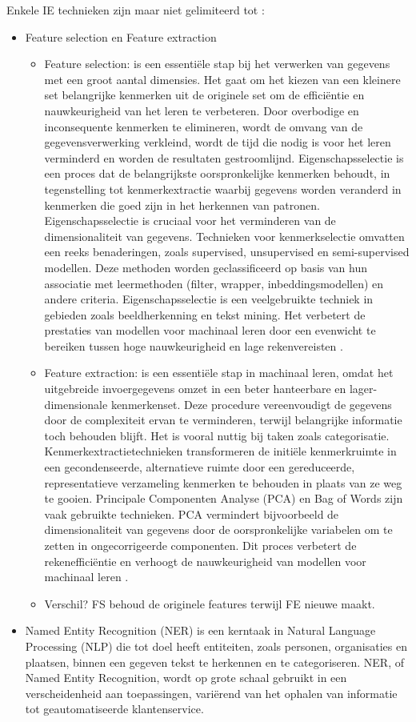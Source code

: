 Enkele IE technieken zijn maar niet gelimiteerd tot \autocite{IBM2024}:
\begin{itemize}
  \item Feature selection en Feature extraction
  \begin{itemize}
    \item Feature selection: is een essentiële stap bij het verwerken van gegevens met een groot aantal dimensies. Het gaat om het kiezen van een kleinere set belangrijke kenmerken uit de originele set om de efficiëntie en nauwkeurigheid van het leren te verbeteren. Door overbodige en inconsequente kenmerken te elimineren, wordt de omvang van de gegevensverwerking verkleind, wordt de tijd die nodig is voor het leren verminderd en worden de resultaten gestroomlijnd. Eigenschapsselectie is een proces dat de belangrijkste oorspronkelijke kenmerken behoudt, in tegenstelling tot kenmerkextractie waarbij gegevens worden veranderd in kenmerken die goed zijn in het herkennen van patronen. Eigenschapsselectie is cruciaal voor het verminderen van de dimensionaliteit van gegevens. Technieken voor kenmerkselectie omvatten een reeks benaderingen, zoals supervised, unsupervised en semi-supervised modellen. Deze methoden worden geclassificeerd op basis van hun associatie met leermethoden (filter, wrapper, inbeddingsmodellen) en andere criteria. Eigenschapsselectie is een veelgebruikte techniek in gebieden zoals beeldherkenning en tekst mining. Het verbetert de prestaties van modellen voor machinaal leren door een evenwicht te bereiken tussen hoge nauwkeurigheid en lage rekenvereisten \autocite{CAI201870}.
    \item Feature extraction: is een essentiële stap in machinaal leren, omdat het uitgebreide invoergegevens omzet in een beter hanteerbare en lager-dimensionale kenmerkenset. Deze procedure vereenvoudigt de gegevens door de complexiteit ervan te verminderen, terwijl belangrijke informatie toch behouden blijft. Het is vooral nuttig bij taken zoals categorisatie. Kenmerkextractietechnieken transformeren de initiële kenmerkruimte in een gecondenseerde, alternatieve ruimte door een gereduceerde, representatieve verzameling kenmerken te behouden in plaats van ze weg te gooien. Principale Componenten Analyse (PCA) en Bag of Words zijn vaak gebruikte technieken. PCA vermindert bijvoorbeeld de dimensionaliteit van gegevens door de oorspronkelijke variabelen om te zetten in ongecorrigeerde componenten. Dit proces verbetert de rekenefficiëntie en verhoogt de nauwkeurigheid van modellen voor machinaal leren \autocite{Mustazzihim}.
    \item Verschil? FS behoud de originele features terwijl FE nieuwe maakt.
  \end{itemize}
    \item  Named Entity Recognition (NER) is een kerntaak in Natural Language Processing (NLP) die tot doel heeft entiteiten, zoals personen, organisaties en plaatsen, binnen een gegeven tekst te herkennen en te categoriseren. NER, of Named Entity Recognition, wordt op grote schaal gebruikt in een verscheidenheid aan toepassingen, variërend van het ophalen van informatie tot geautomatiseerde klantenservice.
    



\end{itemize}
